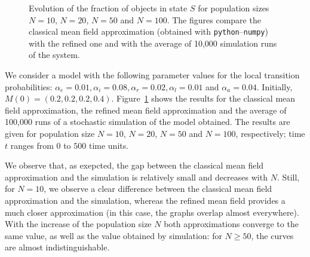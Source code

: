 \documentclass{amsart}
\begin{document}
\begin{figure}[ht]
  \caption{\label{fig:res} Evolution of the fraction of objects in
    state $S$ for population sizes $N=10$, $N=20$, $N=50$ and
    $N=100$. The figures compare the classical mean field
    approximation (obtained with \texttt{python}--\texttt{numpy}) with
    the refined one and with the average of 10,000 simulation runs of
    the system.  }
\end{figure}

We consider a model with the following parameter values for the local
transition probabilities:
$\alpha_e=0.01, \alpha_i=0.08,\alpha_r=0.02,\alpha_l=0.01$ and
$\alpha_a=0.04$. Initially,
$M(0)=(0.2,0.2,0.2,0.4)$. Figure~\ref{fig:res} shows the results for
the classical mean field approximation, the refined mean field
approximation and the average of 100,000 runs of a stochastic
simulation of the model obtained. The results are given for
population size $N=10$, $N=20$, $N=50$ and $N=100$, respectively; time
$t$ ranges from $0$ to $500$ time units.

We observe that, as exepcted, the gap between the classical mean field
approximation and the simulation is relatively small and decreases
with $N$. Still, for $N=10$, we observe a clear difference between the
classical mean field approximation and the simulation, whereas the
refined mean field provides a much closer approximation (in this case,
the graphs overlap almost everywhere). With the increase of the
population size $N$ both approximations converge to the same value, as
well as the value obtained by simulation: for $N\ge50$, the curves
are almost indistinguishable.
\end{document}
